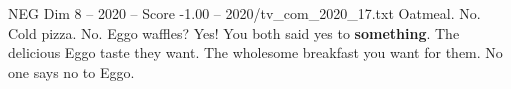 \begin{textsample}{NEG Dim 8 – 2020 – Score -1.00 – 2020/tv\_com\_2020\_17.txt}  \label{ex:f8_neg_073}
Oatmeal.
No.
Cold pizza.
No.
Eggo waffles?
Yes!
You both said yes to \textbf{something}.
The delicious Eggo taste they want.
The wholesome breakfast you want for them.
No one says no to Eggo.

\end{textsample}
